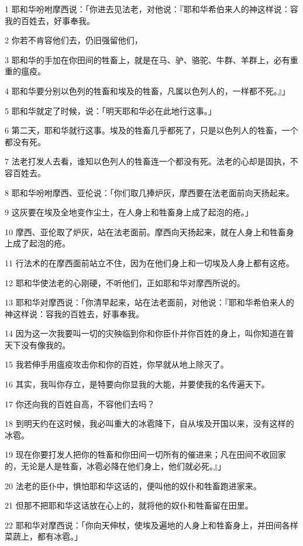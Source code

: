 \par 1 耶和华吩咐摩西说：「你进去见法老，对他说：『耶和华希伯来人的神这样说：容我的百姓去，好事奉我。
\par 2 你若不肯容他们去，仍旧强留他们，
\par 3 耶和华的手加在你田间的牲畜上，就是在马、驴、骆驼、牛群、羊群上，必有重重的瘟疫。
\par 4 耶和华要分别以色列的牲畜和埃及的牲畜，凡属以色列人的，一样都不死。』」
\par 5 耶和华就定了时候，说：「明天耶和华必在此地行这事。」
\par 6 第二天，耶和华就行这事。埃及的牲畜几乎都死了，只是以色列人的牲畜，一个都没有死。
\par 7 法老打发人去看，谁知以色列人的牲畜连一个都没有死。法老的心却是固执，不容百姓去。
\par 8 耶和华吩咐摩西、亚伦说：「你们取几捧炉灰，摩西要在法老面前向天扬起来。
\par 9 这灰要在埃及全地变作尘土，在人身上和牲畜身上成了起泡的疮。」
\par 10 摩西、亚伦取了炉灰，站在法老面前。摩西向天扬起来，就在人身上和牲畜身上成了起泡的疮。
\par 11 行法术的在摩西面前站立不住，因为在他们身上和一切埃及人身上都有这疮。
\par 12 耶和华使法老的心刚硬，不听他们，正如耶和华对摩西所说的。
\par 13 耶和华对摩西说：「你清早起来，站在法老面前，对他说：『耶和华希伯来人的神这样说：容我的百姓去，好事奉我。
\par 14 因为这一次我要叫一切的灾殃临到你和你臣仆并你百姓的身上，叫你知道在普天下没有像我的。
\par 15 我若伸手用瘟疫攻击你和你的百姓，你早就从地上除灭了。
\par 16 其实，我叫你存立，是特要向你显我的大能，并要使我的名传遍天下。
\par 17 你还向我的百姓自高，不容他们去吗？
\par 18 到明天约在这时候，我必叫重大的冰雹降下，自从埃及开国以来，没有这样的冰雹。
\par 19 现在你要打发人把你的牲畜和你田间一切所有的催进来；凡在田间不收回家的，无论是人是牲畜，冰雹必降在他们身上，他们就必死。』」
\par 20 法老的臣仆中，惧怕耶和华这话的，便叫他的奴仆和牲畜跑进家来。
\par 21 但那不把耶和华这话放在心上的，就将他的奴仆和牲畜留在田里。
\par 22 耶和华对摩西说：「你向天伸杖，使埃及遍地的人身上和牲畜身上，并田间各样菜蔬上，都有冰雹。」
